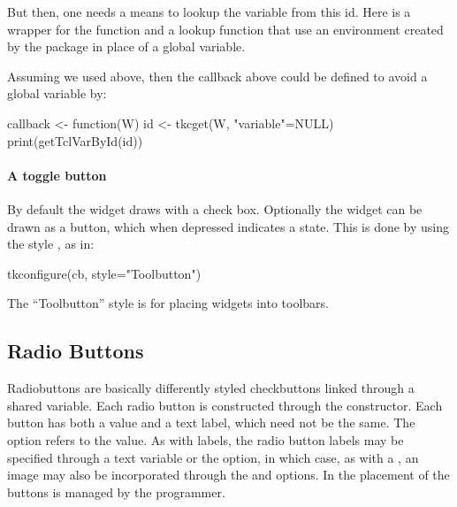 But then, one needs a means to lookup the variable from this id. Here is a
wrapper for the  function and a lookup function that
use an environment created by the  package in place of a
global variable.

\begin{Schunk}
\end{Schunk}

Assuming we used  above, then the callback above
could be defined to avoid a global variable by:


\begin{Schunk}
\begin{Sinput}
 callback <- function(W) {
   id <- tkcget(W, "variable"=NULL)
   print(getTclVarById(id))
 }
\end{Sinput}
\end{Schunk}



\paragraph{A toggle button}

By default the widget draws with a check box. Optionally the widget
can be drawn as a button, which when depressed indicates a 
state. This is done by using the style , as in:
\begin{Schunk}
\begin{Sinput}
 tkconfigure(cb, style="Toolbutton")
\end{Sinput}
\end{Schunk}

The ``Toolbutton'' style is for placing widgets into toolbars.

\subsection{Radio Buttons}
\label{sec:tcltk:radio-buttons}

Radiobuttons are basically differently styled checkbuttons linked through a shared \TCL\/
variable. Each radio button is constructed through the
 constructor. Each button has both a value and
a text label, which need not be the same. The
 option refers to the
value. As with labels, the radio button labels may be specified
through a text variable or the  option,
in which case, as with a , an image may also be
incorporated through the  and
 options. In \TK\/ the placement of
the buttons is managed by the programmer.


